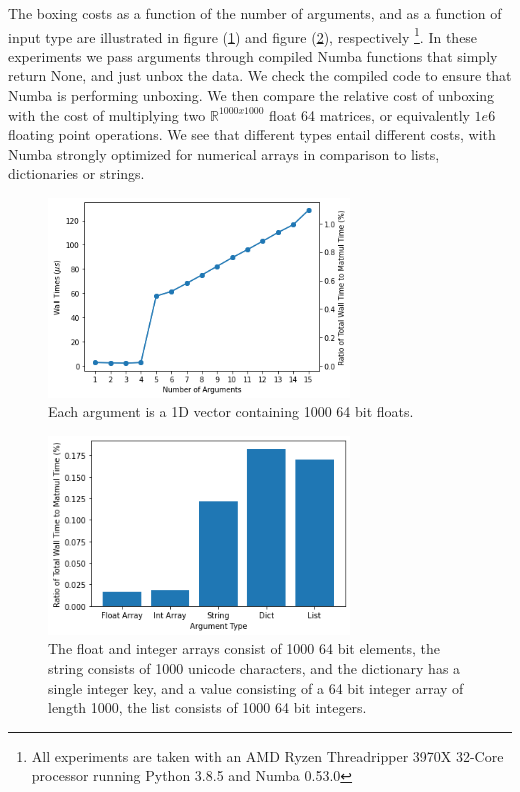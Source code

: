 \documentclass{IEEEcsmag}
\begin{document}
The boxing costs as a function of the number of arguments, and as a function of input type are illustrated in figure (\ref{fig:boxing_cost_nargs}) and figure (\ref{fig:boxing_cost_types}), respectively \footnote{All experiments are taken with an AMD Ryzen Threadripper 3970X 32-Core processor running Python 3.8.5 and Numba 0.53.0}. In these experiments we pass arguments through compiled Numba functions that simply return None, and just unbox the data. We check the compiled code to ensure that Numba is performing unboxing. We then compare the relative cost of unboxing with the cost of multiplying two $\mathbb{R}^{1000x1000}$ float 64 matrices, or equivalently $1e6$ floating point operations. We see that different types entail different costs, with Numba strongly optimized for numerical arrays in comparison to lists, dictionaries or strings.

\begin{figure}
	\centerline{\includegraphics[width=8cm]{figures/boxing_cost_nargs.png}}
	\caption{Each argument is a 1D vector containing 1000 64 bit floats.}
	\label{fig:boxing_cost_nargs}
\end{figure}

\begin{figure}
	\centerline{\includegraphics[width=8cm]{figures/boxing_cost_types.png}}
	\caption{The float and integer arrays consist of 1000 64 bit elements, the string consists of 1000 unicode characters, and the dictionary has a single integer key, and a value consisting of a 64 bit integer array of length 1000, the list consists of 1000 64 bit integers.}
	\label{fig:boxing_cost_types}
\end{figure}
\end{document}
